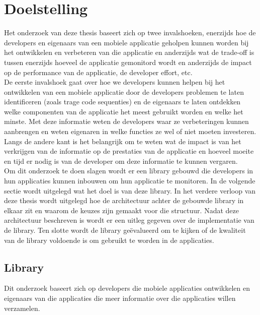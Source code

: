 \chapter{Doelstelling}
Het onderzoek van deze thesis baseert zich op twee invalshoeken, enerzijds hoe de developers en eigenaars van een mobiele applicatie geholpen kunnen worden bij het ontwikkelen en verbeteren van die applicatie en anderzijds wat de trade-off is tussen enerzijds hoeveel de applicatie gemonitord wordt en anderzijds de impact op de performance van de applicatie, de developer effort, etc. \\

De eerste invalshoek gaat over hoe we developers kunnen helpen bij het ontwikkelen van een mobiele applicatie door de developers problemen te laten identificeren (zoals trage code sequenties) en de eigenaars te laten ontdekken welke componenten van de applicatie het meest gebruikt worden en welke het minste. Met deze informatie weten de developers waar ze verbeteringen kunnen aanbrengen en weten eigenaren in welke functies ze wel of niet moeten investeren. \\

Langs de andere kant is het belangrijk om te weten wat de impact is van het verkrijgen van de informatie op de prestaties van de applicatie en hoeveel moeite en tijd er nodig is van de developer om deze informatie te kunnen vergaren.\\


Om dit onderzoek te doen slagen wordt er een library gebouwd die developers in hun applicaties kunnen inbouwen om hun applicatie te monitoren. In de volgende sectie wordt uitgelegd wat het doel is van deze library. In het verdere verloop van deze thesis wordt uitgelegd hoe de architectuur achter de gebouwde library in elkaar zit en waarom de keuzes zijn gemaakt voor die structuur. Nadat deze architectuur beschreven is wordt er een uitleg gegeven over de implementatie van de library. Ten slotte wordt de library ge\"evalueerd om te kijken of de kwaliteit van de library voldoende is om gebruikt te worden in de applicaties. 

\section{Library}
Dit onderzoek baseert zich op developers die mobiele applicaties ontwikkelen en eigenaars van die applicaties die meer informatie over die applicaties willen verzamelen. \\


